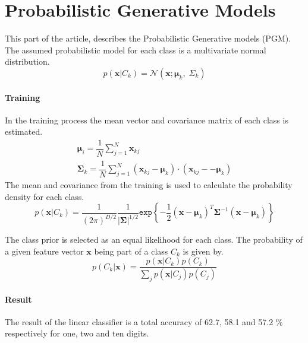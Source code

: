 \section*{Probabilistic Generative Models}
This part of the article, describes the Probabilistic Generative models (PGM).
The assumed probabilistic model for each class is a multivariate normal distribution. 
\begin{equation}
p(\mathbf{x}|C_k)=
\mathcal{N}(\mathbf{x};\mathbf{\mu}_k, \; \Sigma_k) 
\label{eq:gauss_dist} 
\end{equation}

\paragraph*{Training}
In the training process the mean vector and covariance matrix of each class is estimated.
\begin{eqnarray}
\bm{\mu}_i= \dfrac{1}{N} \sum_{j=1}^{N} \mathbf{x}_{kj} \\
\bm{\Sigma}_k =\dfrac{1}{N} \sum_{j=1}^{N} (\mathbf{x}_{kj}-\bm{\mu}_k) \cdot (\mathbf{x}_{kj}--\bm{\mu}_k)
\end{eqnarray}
The mean and covariance from the training is used to calculate the probability density for each class.
\begin{equation}
p(\mathbf{x}|C_k)=  
\dfrac{1}{(2\pi)^{D/2}} \dfrac{1}{\left|\mathbf{\Sigma} \right|^{1/2}} 
\mathtt{exp} \left\lbrace -\dfrac{1}{2} (\mathbf{x}-\mathbf{\mu}_k)^T \mathbf{\Sigma}^{-1} (\mathbf{x}-\mathbf{\mu}_k) \right\rbrace
\end{equation}

The class prior is selected as an equal likelihood for each class. The probability of a given feature vector $ \mathbf{x} $ being part of a class $ C_k $ is given by.
\begin{equation}
p(C_k |\mathbf{x}) =
\dfrac{p(\mathbf{x}|C_k) p(C_k)}
{\sum_j p(\mathbf{x}|C_j) p(C_j)}
\end{equation}

\paragraph*{Result}
The result of the linear classifier is a total accuracy of 62.7, 58.1 and 57.2 \% respectively for one, two and ten digits. 